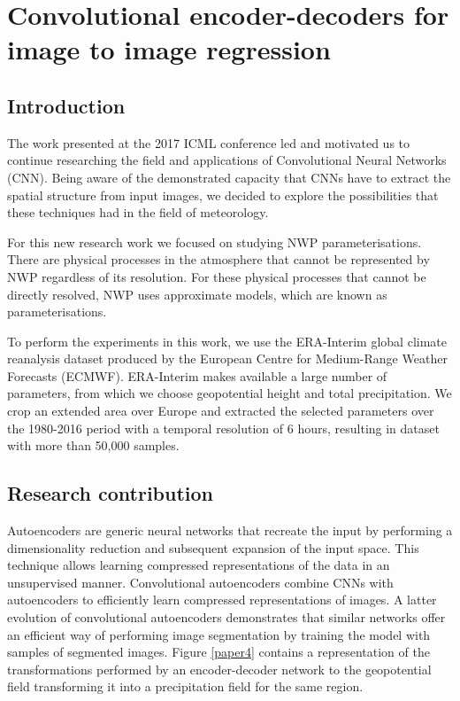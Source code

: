 

\section{Convolutional encoder-decoders for image to image regression}

\subsection{Introduction}
The work presented at the 2017 ICML conference led and motivated us to continue researching the field and applications of Convolutional Neural Networks (CNN). Being aware of the demonstrated capacity that CNNs have to extract the spatial structure from input images, we decided to explore the possibilities that these techniques had in the field of meteorology.

For this new research work we focused on studying NWP parameterisations. There are physical processes in the atmosphere that cannot be represented by NWP regardless of its resolution. For these physical processes that cannot be directly resolved, NWP uses approximate models, which are known as parameterisations.

To perform the experiments in this work, we use the ERA-Interim global climate reanalysis dataset produced by the European Centre for Medium-Range Weather Forecasts (ECMWF). ERA-Interim makes available a large number of parameters, from which we choose geopotential height and total precipitation. We crop an extended area over Europe and extracted the selected parameters over the 1980-2016 period with a temporal resolution of 6 hours, resulting in dataset with more than 50,000 samples. 


\subsection{Research contribution}

Autoencoders \citep{hinton2006reducing} are generic neural networks that recreate the input by performing a dimensionality reduction and subsequent expansion of the input space. This technique allows learning compressed representations of the data in an unsupervised manner. Convolutional autoencoders combine CNNs with autoencoders to efficiently learn compressed representations of images. A latter evolution of convolutional autoencoders demonstrates that similar networks offer an efficient way of performing image segmentation by training the model with samples of segmented images. Figure \ref{paper4} contains a representation of the transformations performed by an encoder-decoder network to the geopotential field transforming it into a precipitation field for the same region.


